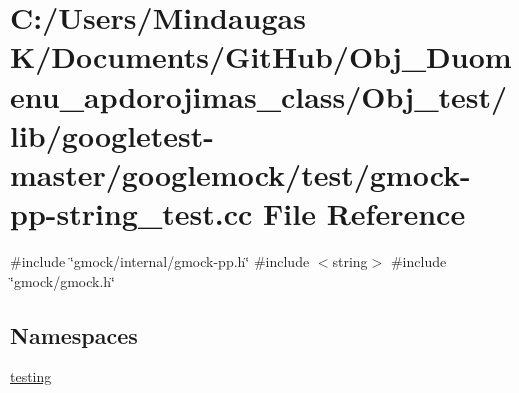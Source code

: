 \hypertarget{_obj__test_2lib_2googletest-master_2googlemock_2test_2gmock-pp-string__test_8cc}{}\section{C\+:/\+Users/\+Mindaugas K/\+Documents/\+Git\+Hub/\+Obj\+\_\+\+Duomenu\+\_\+apdorojimas\+\_\+class/\+Obj\+\_\+test/lib/googletest-\/master/googlemock/test/gmock-\/pp-\/string\+\_\+test.cc File Reference}
\label{_obj__test_2lib_2googletest-master_2googlemock_2test_2gmock-pp-string__test_8cc}
{\ttfamily \#include \char`\"{}gmock/internal/gmock-\/pp.\+h\char`\"{}}\newline
{\ttfamily \#include $<$string$>$}\newline
{\ttfamily \#include \char`\"{}gmock/gmock.\+h\char`\"{}}\newline
\subsection*{Namespaces}
\begin{DoxyCompactItemize}
\item 
 \mbox{\hyperlink{namespacetesting}{testing}}
\end{DoxyCompactItemize}
